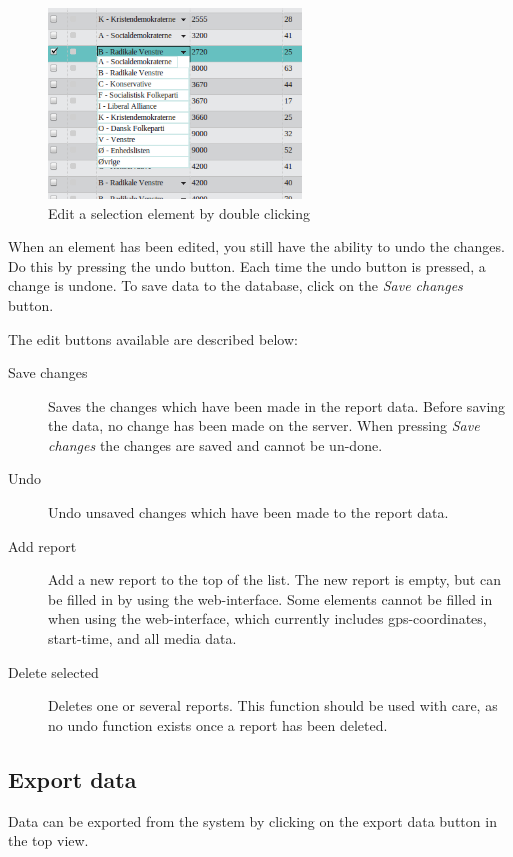 \documentclass[a4paper, 12pt, final]{article}
\begin{document}
\begin{figure}[H]
  \centering
  \includegraphics[width=0.6\textwidth]{pics/web_edit_select_one.png}
  \caption{Edit a selection element by double clicking}
  \label{fig:web_edit_select_one}
\end{figure}


When an element has been edited, you still have the ability to undo the changes. Do this by pressing the undo button. Each time the undo button is pressed, a change is undone. To save data to the database, click on the \emph{Save changes} button. 

The edit buttons available are described below:

\begin{description}
\item[Save changes] Saves the changes which have been made in the report data. Before saving the data, no change has been made on the server. When pressing \emph{Save changes} the changes are saved and cannot be un-done.
\item[Undo] Undo unsaved changes which have been made to the report data.
\item[Add report] Add a new report to the top of the list. The new report is empty, but can be filled in by using the web-interface. Some elements cannot be filled in when using the web-interface, which currently includes gps-coordinates, start-time, and all media data.
\item[Delete selected] Deletes one or several reports. This function should be used with care, as no undo function exists once a report has been deleted. 
\end{description}

\subsection{Export data}

Data can be exported from the system by clicking on the export data button in the top view.
\end{document}

